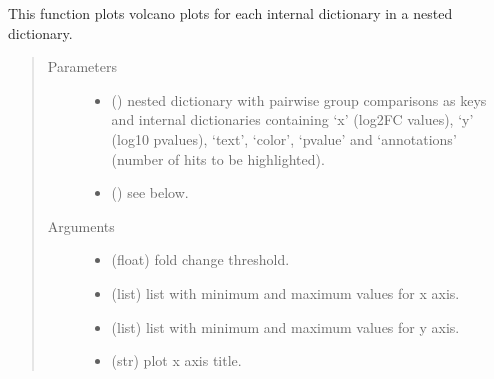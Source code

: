 \documentclass[letterpaper,10pt,english]{sphinxmanual}
\begin{document}
\begin{fulllineitems}
\label{\detokenize{_autosummary/analytics_core.viz:analytics_core.viz.viz.get_volcanoplot}}
This function plots volcano plots for each internal dictionary in a nested dictionary.
\begin{quote}\begin{description}
\item[{Parameters}] \leavevmode\begin{itemize}
\item {} 
 (\sphinxstyleliteralemphasis{\sphinxupquote{{[}}}\sphinxstyleliteralemphasis{\sphinxupquote{{]}}}) \textendash{} nested dictionary with pairwise group comparisons as keys and internal dictionaries containing ‘x’ (log2FC values),                                 ‘y’ (\sphinxhyphen{}log10 p\sphinxhyphen{}values), ‘text’, ‘color’, ‘pvalue’ and ‘annotations’ (number of hits to be highlighted).

\item {} 
 () \textendash{} see below.

\end{itemize}

\item[{Arguments}] \leavevmode\begin{itemize}
\item {} 
 (float) \textendash{} fold change threshold.

\item {} 
 (list) \textendash{} list with minimum and maximum values for x axis.

\item {} 
 (list) \textendash{} list with minimum and maximum values for y axis.

\item {} 
 (str) \textendash{} plot x axis title.


\end{itemize}
\end{description}
\end{quote}
\end{fulllineitems}
\end{document}
